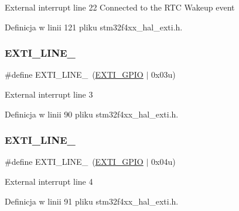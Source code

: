 External interrupt line 22 Connected to the R\+TC Wakeup event 

Definicja w linii 121 pliku stm32f4xx\+\_\+hal\+\_\+exti.\+h.

\mbox{\label{group___e_x_t_i___line_ga7e223d61dcb2b538040824c0b491d68c}} 
\subsubsection{\texorpdfstring{E\+X\+T\+I\+\_\+\+L\+I\+N\+E\+\_}{EXTI\_LINE\_3}}
{\footnotesize\ttfamily \#define E\+X\+T\+I\+\_\+\+L\+I\+N\+E\+\_~(\hyperlink{group___e_x_t_i___private___constants_gacfa322960fc87db022536119cabb4d2a}{E\+X\+T\+I\+\_\+\+G\+P\+IO}       $\vert$ 0x03u)}

External interrupt line 3 

Definicja w linii 90 pliku stm32f4xx\+\_\+hal\+\_\+exti.\+h.

\mbox{\label{group___e_x_t_i___line_gaf8e1e94adf29806583e68170c1dad7dd}} 
\subsubsection{\texorpdfstring{E\+X\+T\+I\+\_\+\+L\+I\+N\+E\+\_}{EXTI\_LINE\_4}}
{\footnotesize\ttfamily \#define E\+X\+T\+I\+\_\+\+L\+I\+N\+E\+\_~(\hyperlink{group___e_x_t_i___private___constants_gacfa322960fc87db022536119cabb4d2a}{E\+X\+T\+I\+\_\+\+G\+P\+IO}       $\vert$ 0x04u)}

External interrupt line 4 

Definicja w linii 91 pliku stm32f4xx\+\_\+hal\+\_\+exti.\+h.

\mbox{\label{group___e_x_t_i___line_gab7859f0b07e671f71be61d7d301eb909}} 
